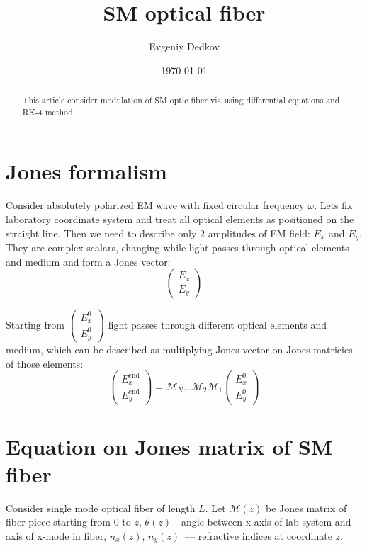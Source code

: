 \documentclass[12pt, notitlepage]{report}
\title{SM optical fiber}
\author{Evgeniy Dedkov}
\date{\today}
\begin{document}
	
	\newcommand{\mcm}{\mathcal{M}}
	
	\maketitle
	\thispagestyle{empty}
	
	\begin{abstract}
		This article consider modulation of SM optic fiber via using differential equations and RK-4 method.
	\end{abstract}
	
	\section{Jones formalism}
	Consider absolutely polarized EM wave with fixed circular frequency $\omega$. Lets fix laboratory coordinate system and treat all optical elements as positioned on the straight line. Then we need to describe only 2 amplitudes of EM field: $E_x$ and $E_y$. They are complex scalars, changing while light passes through optical elements and medium and form a Jones vector:
	$$
	\begin{pmatrix}
		E_x \\
		E_y
	\end{pmatrix}
	$$
	
	Starting from $
	\begin{pmatrix}
		E_{x}^0 \\
		E_{y}^0
	\end{pmatrix}
	$ light passes through different optical elements and medium, which can be described as multiplying Jones vector on Jones matricies of those elements:
	$$
		\begin{pmatrix}
		E_{x}^\text{end} \\
		E_y^\text{end}
	\end{pmatrix} = \mathcal{M}_N\dots\mathcal{M}_2\mathcal{M}_1\begin{pmatrix}
	E_{x}^0 \\
	E_{y}^0
\end{pmatrix}
	$$
	\section{Equation on Jones matrix of SM fiber}
	Consider single mode optical fiber of length $L$. Let $\mathcal{M}(z)$ be Jones matrix of fiber piece starting from 0 to $z$, $\theta(z)$ - angle between x-axis of lab system and axis of x-mode in fiber, $n_x(z)$, $n_y(z)$~--- refractive indices at coordinate $z$. 
	
\end{document}
